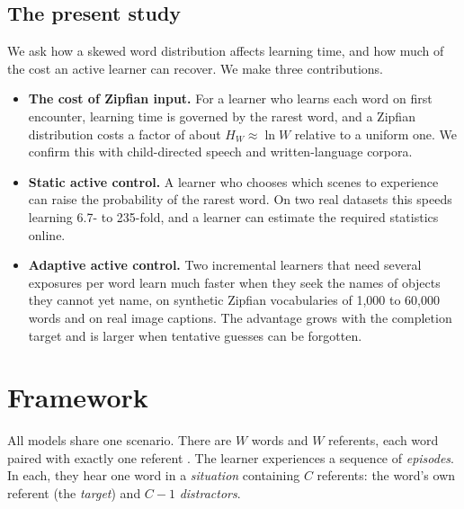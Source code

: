 \documentclass[a4paper,natbib,man]{apa6}
\begin{document}
\subsection{The present study}
We ask how a skewed word distribution affects learning time, and how much of the cost an active learner can recover. We make three contributions.
\begin{itemize}
\item {\bf The cost of Zipfian input.} For a learner who learns each word on first encounter, learning time is governed by the rarest word, and a Zipfian distribution costs a factor of about $H_W \approx \ln W$ relative to a uniform one. We confirm this with child-directed speech and written-language corpora.
\item {\bf Static active control.} A learner who chooses which scenes to experience can raise the probability of the rarest word. On two real datasets this speeds learning 6.7- to 235-fold, and a learner can estimate the required statistics online.
\item {\bf Adaptive active control.} Two incremental learners that need several exposures per word learn much faster when they seek the names of objects they cannot yet name, on synthetic Zipfian vocabularies of 1,000 to 60,000 words and on real image captions. The advantage grows with the completion target and is larger when tentative guesses can be forgotten.
\end{itemize}

\section{Framework}

All models share one scenario. There are $W$ words and $W$ referents, each word paired with exactly one referent \citep[following][]{Blythe:2010}. The learner experiences a sequence of \textit{episodes}. In each, they hear one word in a \textit{situation} containing $C$ referents: the word's own referent (the \textit{target}) and $C-1$ \textit{distractors}.
\end{document}
